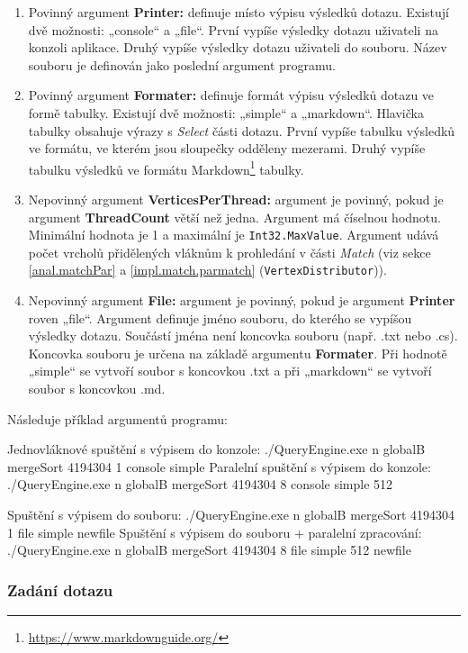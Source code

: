\begin{enumerate}
\item Povinný argument \textbf{Printer:} definuje místo výpisu výsledků dotazu.
Existují dvě možnosti: „console“ a „file“.
První vypíše výsledky dotazu uživateli na konzoli aplikace.
Druhý vypíše výsledky dotazu uživateli do souboru.
Název souboru je definován jako poslední argument programu.

\item Povinný argument \textbf{Formater:} definuje formát výpisu výsledků dotazu ve formě tabulky.
Existují dvě možnosti: „simple“ a „markdown“.
Hlavička tabulky obsahuje výrazy s \textit{Select} části dotazu.
První vypíše tabulku výsledků ve formátu, ve kterém jsou sloupečky odděleny mezerami.
Druhý vypíše tabulku výsledků ve formátu Markdown\footnote{\url{https://www.markdownguide.org/}} tabulky.

\item Nepovinný argument \textbf{VerticesPerThread:} argument je povinný, pokud je argument \textbf{ThreadCount} větší než jedna.
Argument má číselnou hodnotu.
Minimální hodnota je 1 a maximální je \texttt{Int32.MaxValue}.
Argument udává počet vrcholů přidělených vláknům k prohledání v části \textit{Match} (viz sekce \ref{anal.matchPar} a \ref{impl.match.parmatch} (\texttt{VertexDistributor})).

\item Nepovinný argument \textbf{File:} argument je povinný, pokud je argument \textbf{Printer} roven „file“.
Argument definuje jméno souboru, do kterého se vypíšou výsledky dotazu.
Součástí jména není koncovka souboru (např. .txt nebo .cs).
Koncovka souboru je určena na základě argumentu \textbf{Formater}.
Při hodnotě „simple“ se vytvoří soubor s koncovkou .txt a při „markdown“ se vytvoří soubor s koncovkou .md. 
\end{enumerate}

Následuje příklad argumentů programu:
\begin{code}
Jednovláknové spuštění s výpisem do konzole:
./QueryEngine.exe n globalB mergeSort 4194304 1 console simple
Paralelní spuštění s výpisem do konzole:
./QueryEngine.exe n globalB mergeSort 4194304 8 console simple 512

Spuštění s výpisem do souboru:  
./QueryEngine.exe n globalB mergeSort 4194304 1 file simple newfile
Spuštění s výpisem do souboru + paralelní zpracování:
./QueryEngine.exe n globalB mergeSort 4194304 8 file simple 512 newfile
\end{code}

\subsubsection{Zadání dotazu}


